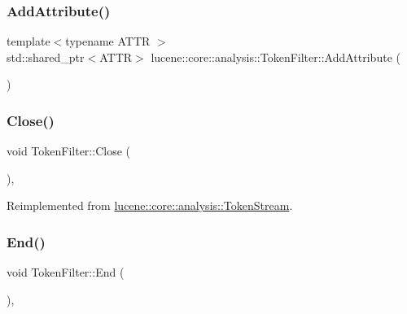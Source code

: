 \subsubsection{\texorpdfstring{Add\+Attribute()}{AddAttribute()}}
{\footnotesize\ttfamily template$<$typename A\+T\+TR $>$ \\
std\+::shared\+\_\+ptr$<$A\+T\+TR$>$ lucene\+::core\+::analysis\+::\+Token\+Filter\+::\+Add\+Attribute (\begin{DoxyParamCaption}{ }\end{DoxyParamCaption})\hspace{0.3cm}{\ttfamily [inline]}}

\mbox{\label{classlucene_1_1core_1_1analysis_1_1TokenFilter_a4b991b01385423b87b5714061e4326c8}} 
\subsubsection{\texorpdfstring{Close()}{Close()}}
{\footnotesize\ttfamily void Token\+Filter\+::\+Close (\begin{DoxyParamCaption}{ }\end{DoxyParamCaption})\hspace{0.3cm}{\ttfamily [override]}, {\ttfamily [virtual]}}



Reimplemented from \mbox{\hyperlink{classlucene_1_1core_1_1analysis_1_1TokenStream_ad7963391ddbb2c75610e3738ba5155c8}{lucene\+::core\+::analysis\+::\+Token\+Stream}}.

\mbox{\label{classlucene_1_1core_1_1analysis_1_1TokenFilter_ad2e29dd32aa4df385d0f290f10f20721}} 
\subsubsection{\texorpdfstring{End()}{End()}}
{\footnotesize\ttfamily void Token\+Filter\+::\+End (\begin{DoxyParamCaption}{ }\end{DoxyParamCaption})\hspace{0.3cm}{\ttfamily [override]}, {\ttfamily [virtual]}}



